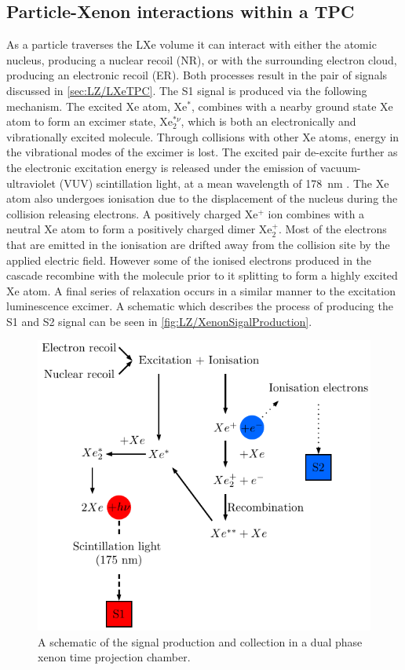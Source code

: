 \subsection{Particle-Xenon interactions within a TPC}\label{sec:LZ/XeInteractionsTPC}
As a particle traverses the LXe volume it can interact with either the atomic nucleus, producing a nuclear recoil (NR), or with the surrounding electron cloud, producing an electronic recoil (ER). Both processes result in the pair of signals discussed in \autoref{sec:LZ/LXeTPC}. The S1 signal is produced via the following mechanism. The excited Xe atom, Xe$^{*}$, combines with a nearby ground state Xe atom to form an excimer state, Xe$_{2}^{*\nu}$, which is both an electronically and vibrationally excited molecule. Through collisions with other Xe atoms, energy in the vibrational modes of the excimer is lost. The excited pair de-excite further as the electronic excitation energy is released under the emission of vacuum-ultraviolet (VUV) scintillation light, at a mean wavelength of 178~nm \cite{Schumann:2014uva}.
The Xe atom also undergoes ionisation due to the displacement of the nucleus during the collision releasing electrons. A positively charged Xe$^{+}$ ion combines with a neutral Xe atom to form a positively charged dimer Xe$^{+}_{2}$. Most of the electrons that are emitted in the ionisation are drifted away from the collision site by the applied electric field. However some of the ionised electrons produced in the cascade recombine with the molecule prior to it splitting to form a highly excited Xe atom. A final series of relaxation occurs in a similar manner to the excitation luminescence excimer. A schematic which describes the process of producing the S1 and S2 signal can be seen in \autoref{fig:LZ/XenonSigalProduction}.
\begin{figure}[!ht]
    \centering
    \includegraphics[width=0.7\linewidth]{figures/LZ/Xenon_interaction.pdf}
    \caption[A schematic of the signal production and collection in a dual phase xenon TPC.]{A schematic of the signal production and collection in a dual phase xenon time projection chamber.}
    \label{fig:LZ/XenonSigalProduction}
\end{figure}
